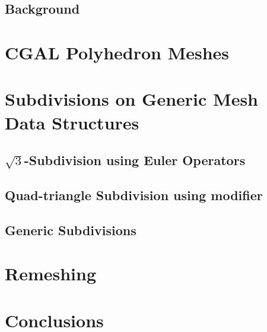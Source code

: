 \documentclass{egpubl}
\begin{document}
\subsection{Background}
 

\section{CGAL Polyhedron Meshes}
 

\section{Subdivisions on Generic Mesh Data Structures}


\subsection{$\sqrt{3}$-Subdivision using Euler Operators}

\subsection{Quad-triangle Subdivision using modifier}


\subsection{Generic Subdivisions}


\section{Remeshing}


\section{Conclusions}




\end{document}
